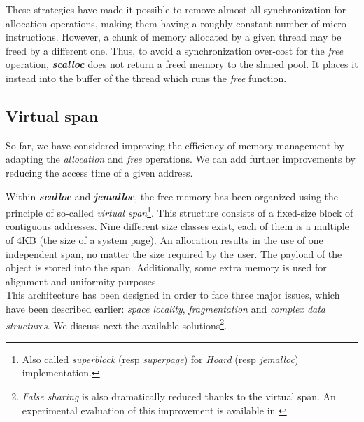 \documentclass[10pt]{article}											%
\begin{document}
These strategies have made it possible to remove almost all synchronization for allocation operations, making them having a roughly constant number of micro instructions.   However, a chunk of memory allocated by a given thread may be freed by a different one.   Thus, to avoid a synchronization over-cost for the \textit{free} operation, \textbf{\textit{scalloc}}\cite{scalloc_aigner} does not return a freed memory to the shared pool.  It places it instead into the buffer of the thread which runs the \textit{free} function.



\subsection{Virtual span} \label{virtualSpanDefinition}
So far, we have considered improving the efficiency of memory management by adapting the \textit{allocation} and \textit{free} operations.   We can add further improvements by reducing the access time of a given address.

Within \textbf{\textit{scalloc}}\cite{scalloc_aigner} and \textbf{\textit{jemalloc}}\cite{jemalloc_evans}, the free memory has been organized using the principle of so-called \emph{virtual span}\footnote{Also called \emph{superblock} (resp \emph{superpage}) for \emph{Hoard}\cite{hoard_berger} (resp \emph{jemalloc}\cite{jemalloc_evans}) implementation.}.   This structure consists of a fixed-size block of contiguous addresses.   Nine different size classes exist, each of them is a multiple of 4KB (the size of a system page).   An allocation results in the use of one independent span, no matter the size required by the user. 
The payload of the object is stored into the span.   Additionally, some extra memory is used for alignment and uniformity purposes.\\

This architecture has been designed in order to face three major issues, which have been described earlier: \emph{space locality}, \emph{fragmentation} and \emph{complex data structures}.   We discuss next the available solutions\footnote{\emph{False sharing} is also dramatically reduced thanks to the virtual span.   An experimental evaluation of this improvement is available in \cite{scalloc_aigner}}.


\end{document}
